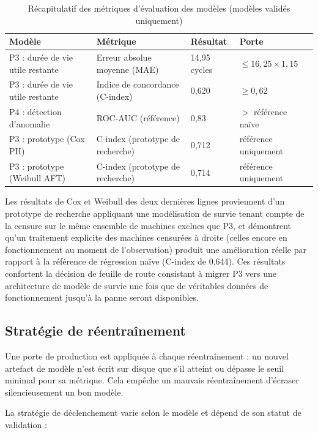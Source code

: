 \begin{table}[h]
\centering
\begin{tabularx}{\textwidth}{|X|X|X|X|}
\toprule
\textbf{Modèle} & \textbf{Métrique} & \textbf{Résultat} & \textbf{Porte} \\
\midrule
P3 : durée de vie utile restante & Erreur absolue moyenne (MAE)    & 14,95 cycles & $\leq 16{,}25 \times 1{,}15$ \\
\midrule
P3 : durée de vie utile restante & Indice de concordance (C-index)  & 0,620        & $\geq 0{,}62$ \\
\midrule
P4 : détection d'anomalie     & ROC-AUC (référence)           & 0,83         & $>$ référence naïve \\
\midrule
P3 : prototype (Cox PH)    & C-index (prototype de recherche) & 0,712        & référence uniquement \\
\midrule
P3 : prototype (Weibull AFT) & C-index (prototype de recherche) & 0,714      & référence uniquement \\
\bottomrule
\end{tabularx}
\caption{Récapitulatif des métriques d'évaluation des modèles (modèles validés uniquement)}
\label{tab:metriques-ml}
\end{table}

Les résultats de Cox et Weibull des deux dernières lignes proviennent d'un prototype de recherche appliquant une modélisation de survie tenant compte de la censure sur le même ensemble de machines exclues que P3, et démontrent qu'un traitement explicite des machines censurées à droite (celles encore en fonctionnement au moment de l'observation) produit une amélioration réelle par rapport à la référence de régression naïve (C-index de 0,644). Ces résultats confortent la décision de feuille de route consistant à migrer P3 vers une architecture de modèle de survie une fois que de véritables données de fonctionnement jusqu'à la panne seront disponibles.

\subsection{Stratégie de réentraînement}

Une porte de production est appliquée à chaque réentraînement : un nouvel artefact de modèle n'est écrit sur disque que s'il atteint ou dépasse le seuil minimal pour sa métrique. Cela empêche un mauvais réentraînement d'écraser silencieusement un bon modèle.

La stratégie de déclenchement varie selon le modèle et dépend de son statut de validation :

